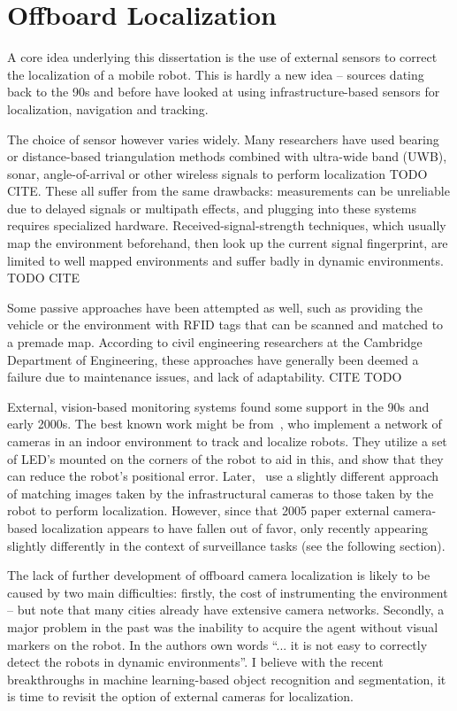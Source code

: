 \documentclass[a4paper,12pt,twoside,openright]{report}
\begin{document}
\section{Offboard Localization}

A core idea underlying this dissertation is the use of
external sensors to correct the localization of a mobile robot. 
This is hardly a new idea -- sources dating back to the 90s and before have looked at 
using infrastructure-based sensors for localization,
navigation and tracking.

The choice of sensor however varies widely. Many researchers
have used bearing or distance-based triangulation methods combined
with ultra-wide band (UWB), sonar, angle-of-arrival or other wireless
signals to perform localization TODO CITE. These all suffer
from the same drawbacks: measurements can be unreliable
due to delayed signals or multipath effects, and plugging
into these systems requires specialized hardware. Received-signal-strength techniques, 
which usually map the environment beforehand, then look up the current
signal fingerprint, are limited to well mapped environments
and suffer badly in dynamic environments. TODO CITE

Some passive approaches have been attempted as well, such as
providing the vehicle or the environment with RFID tags that
can be scanned and matched to a premade map. According to 
civil engineering researchers at the Cambridge Department of Engineering,
these approaches have generally been deemed a failure due to 
maintenance issues, and lack of adaptability. CITE TODO

External, vision-based monitoring systems found some support
in the 90s and early 2000s. The best known work might be
from~\citeauthor{kruse1998camera}\cite{kruse1998camera}, who implement a network
of cameras in an indoor environment to track and localize robots.
They utilize a set of LED's mounted on the corners of the robot
to aid in this, and show that they can reduce the robot's
positional error. Later,~\citeauthor{menegatti2005distributed}\cite{menegatti2005distributed}
use a slightly different approach of matching images taken
by the infrastructural cameras to those taken by the robot to
perform localization. However, since that 2005 paper external 
camera-based localization appears to have fallen out of favor,
only recently appearing slightly differently
in the context of surveillance tasks (see the following section).

The lack of further development of offboard camera localization
is likely to be caused by two main difficulties: 
firstly, the cost of instrumenting the environment -- but note
that many cities already have extensive camera networks.
Secondly, a major problem in the past was the inability to acquire
the agent without visual markers on the robot. In the authors
own words ``... it is not easy to correctly detect the
robots in dynamic environments''. I believe with the recent 
breakthroughs in machine learning-based object recognition 
and segmentation, it is time to revisit the option of external cameras for localization. 
\end{document}

